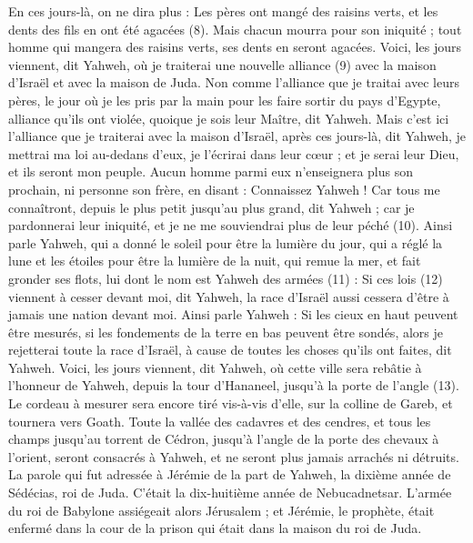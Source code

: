 \begin{multicols}{2}
En ces jours-là, on ne dira plus : Les pères ont mangé des raisins verts, et les dents des fils en ont été agacées\FTNT{} (8).
Mais chacun mourra pour son iniquité ; tout homme qui mangera des raisins verts, ses dents en seront agacées.
Voici, les jours viennent, dit Yahweh, où je traiterai une nouvelle alliance\FTNT{} (9) avec la maison d'Israël et avec la maison de Juda.
Non comme l'alliance que je traitai avec leurs pères, le jour où je les pris par la main pour les faire sortir du pays d'Egypte, alliance qu’ils ont violée, quoique je sois leur Maître, dit Yahweh.
Mais c’est ici l'alliance que je traiterai avec la maison d'Israël, après ces jours-là, dit Yahweh, je mettrai ma loi au-dedans d'eux, je l'écrirai dans leur cœur ; et je serai leur Dieu, et ils seront mon peuple.
Aucun homme parmi eux n’enseignera plus son prochain, ni personne son frère, en disant : Connaissez Yahweh ! Car tous me connaîtront, depuis le plus petit jusqu’au plus grand, dit Yahweh ; car je pardonnerai leur iniquité, et je ne me souviendrai plus de leur péché\FTNT{} (10).
Ainsi parle Yahweh, qui a donné le soleil pour être la lumière du jour, qui a réglé la lune et les étoiles pour être la lumière de la nuit, qui remue la mer, et fait gronder ses flots, lui dont le nom est Yahweh des armées\FTNT{} (11) :
Si ces lois\FTNT{} (12) viennent à cesser devant moi, dit Yahweh, la race d'Israël aussi cessera d'être à jamais une nation devant moi.
Ainsi parle Yahweh : Si les cieux en haut peuvent être mesurés, si les fondements de la terre en bas peuvent être sondés, alors je rejetterai toute la race d'Israël, à cause de toutes les choses qu'ils ont faites, dit Yahweh.
Voici, les jours viennent, dit Yahweh, où cette ville sera rebâtie à l’honneur de Yahweh, depuis la tour d'Hananeel, jusqu'à la porte de l’angle\FTNT{} (13).
Le cordeau à mesurer sera encore tiré vis-à-vis d'elle, sur la colline de Gareb, et tournera vers Goath.
Toute la vallée des cadavres et des cendres, et tous les champs jusqu’au torrent de Cédron, jusqu’à l’angle de la porte des chevaux à l'orient, seront consacrés à Yahweh, et ne seront plus jamais arrachés ni détruits.
\VerseOne{}La parole qui fut adressée à Jérémie de la part de Yahweh, la dixième année de Sédécias, roi de Juda. C’était la dix-huitième année de Nebucadnetsar.
L'armée du roi de Babylone assiégeait alors Jérusalem ; et Jérémie, le prophète, était enfermé dans la cour de la prison qui était dans la maison du roi de Juda.

\end{multicols}
